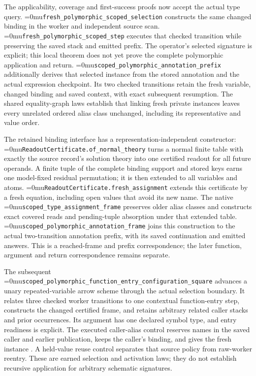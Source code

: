 \documentclass[11pt,a4paper]{article}
\newcommand{\code}[1]{\texttt{\detokenize{#1}}}
\newcommand{\name}[1]{\textup{\Urlmuskip=0mu\relax\nolinkurl{#1}}}
\begin{document}
The applicability, coverage and first-success proofs now accept the actual
type query. \name{fresh_polymorphic_scoped_selection} constructs the same
changed binding in the worker and independent source scan.
\name{fresh_polymorphic_scoped_step} executes that checked transition while
preserving the saved stack and emitted prefix. The operator's selected
signature is explicit; this local theorem does not yet prove the complete
polymorphic application and return.
\name{scoped_polymorphic_annotation_prefix} additionally derives that selected
instance from the stored annotation and the actual expression checkpoint.
Its two checked transitions retain the fresh variable, changed binding and
saved context, with exact subsequent resumption. The shared equality-graph
laws establish that linking fresh private instances leaves every unrelated
ordered alias class unchanged, including its representative and value order.

The retained binding interface has a representation-independent constructor:
\name{ReadoutCertificate.of_normal_theory} turns a normal finite table with
exactly the source record's solution theory into one certified readout for
all future operands. A finite tuple of the complete binding support and
stored keys earns one model-fixed residual permutation; it is then extended
to all variables and atoms. \name{ReadoutCertificate.fresh_assignment}
extends this certificate by a fresh equation, including open values that
avoid its new name. The native \name{scoped_type_assignment_frame} preserves
older alias classes and constructs exact covered reads and pending-tuple
absorption under that extended table.
\name{scoped_polymorphic_annotation_frame} joins this construction to the
actual two-transition annotation prefix, with its saved continuation and
emitted answers. This is a reached-frame and prefix correspondence; the
later function, argument and return correspondence remains separate.

The subsequent
\name{scoped_polymorphic_function_entry_configuration_square} advances a
unary repeated-variable arrow scheme through the actual selection boundary.
It relates three checked worker transitions to one contextual function-entry
step, constructs the changed certified frame, and retains arbitrary related
caller stacks and prior occurrences. Its argument has one declared symbol
type, and entry readiness is explicit. The executed caller-alias control
reserves names in the saved caller and earlier publication, keeps the caller's
\code{Number} binding, and gives the fresh instance \code{Bool}. A held-value
reuse control separates that source policy from raw-worker reentry. These
are earned selection and activation laws; they do not establish recursive
application for arbitrary schematic signatures.
\end{document}
